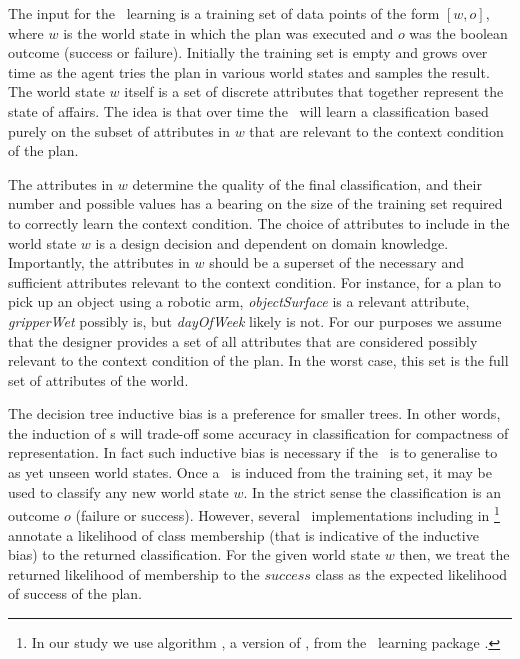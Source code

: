The input for the \dt\ learning is a training set of data points of the form $[w,o]$, where $w$ is the world state in which the plan was executed and $o$ was the boolean outcome (success or failure). Initially the training set is empty and grows over time as the agent tries the plan in various world states and samples the result. The world state $w$ itself is a set of discrete attributes that together represent the state of affairs. The idea is that over time the \dt\ will learn a classification based purely on the subset of attributes in $w$ that are relevant to the context condition of the plan. 

The attributes in $w$ determine the quality of the final classification, and their number and possible values has a bearing on the size of the training set required to correctly learn the context condition. The choice of attributes to include in the world state $w$ is a design decision and dependent on domain knowledge. Importantly, the attributes in $w$ should be a superset of the necessary and sufficient attributes relevant to the context condition. For instance, for a plan to pick up an object using a robotic arm, \textit{objectSurface} is a relevant attribute, \textit{gripperWet} possibly is, but \textit{dayOfWeek} likely is not. For our purposes we assume that the designer provides a set of all attributes that are considered possibly relevant to the context condition of the plan. In the worst case, this set is the full set of attributes of the world. 

The decision tree inductive bias is a preference for smaller trees. In other words, the induction of \dt s will trade-off some accuracy in classification for compactness of representation. In fact such inductive bias is necessary if the \dt\ is to generalise to as yet unseen world states. Once a \dt\ is induced from the training set, it may be used to classify any new world state $w$. In the strict sense the classification is an outcome $o$ (failure or success). However, several \dt\ implementations including  in \weka\footnote{In our study we use algorithm , a version of  \cite{Mitchell97:ML}, from the \weka\ learning package \cite{weka99}.} annotate a likelihood of class membership (that is indicative of the inductive bias) to the returned classification. For the given world state $w$ then, we treat the returned likelihood of membership to the $success$ class as the expected likelihood of success of the plan.



